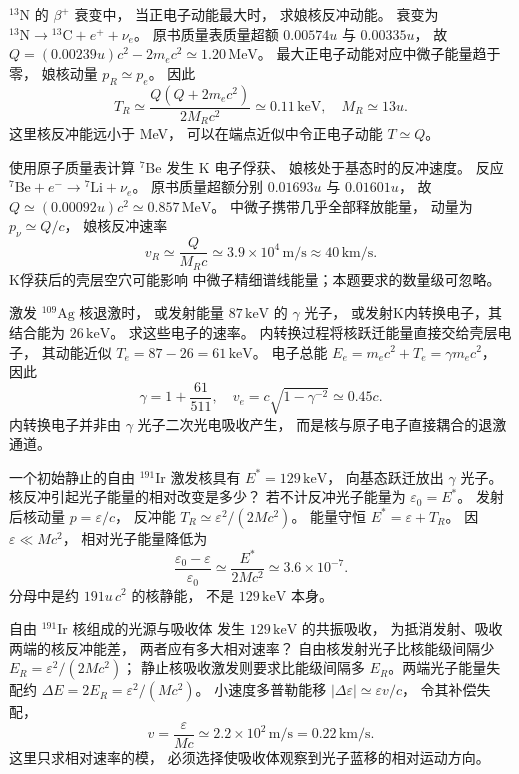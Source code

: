 $\mathrm{^{13}N}$ 的 $\beta^+$ 衰变中，
当正电子动能最大时，
求娘核反冲动能。
\exsolution
衰变为 $\mathrm{^{13}N}\to
\mathrm{^{13}C}+e^++\nu_e$。
原书质量表质量超额
$0.00574u$ 与 $0.00335u$，
故
$Q=(0.00239u)c^2-2m_ec^2
 \simeq1.20\,\mathrm{MeV}$。
最大正电子动能对应中微子能量趋于零，
娘核动量 $p_R\simeq p_e$。
因此
\[
 \boxed{T_R\simeq
 \frac{Q(Q+2m_ec^2)}{2M_Rc^2}
 \simeq0.11\,\mathrm{keV}},
 \quad M_R\simeq13u.
\]
\excheck 这里核反冲能远小于 MeV，
可以在端点近似中令正电子动能 $T\simeq Q$。

使用原子质量表计算
$\mathrm{^{7}Be}$ 发生 K 电子俘获、
娘核处于基态时的反冲速度。
\exsolution
反应
$\mathrm{^{7}Be}+e^-\to\mathrm{^{7}Li}+\nu_e$。
原书质量超额分别
$0.01693u$ 与 $0.01601u$，
故 $Q\simeq(0.00092u)c^2
 \simeq0.857\,\mathrm{MeV}$。
中微子携带几乎全部释放能量，
动量为 $p_\nu\simeq Q/c$，
娘核反冲速率
\[
 \boxed{v_R\simeq\frac{Q}{M_Rc}
 \simeq3.9\times10^4\,\mathrm{m/s}
 \approx40\,\mathrm{km/s}}.
\]
\excheck K俘获后的壳层空穴可能影响
中微子精细谱线能量；本题要求的数量级可忽略。

激发 $\mathrm{^{109}Ag}$ 核退激时，
或发射能量 $87\,\mathrm{keV}$ 的 $\gamma$ 光子，
或发射K内转换电子，其结合能为
$26\,\mathrm{keV}$。
求这些电子的速率。
\exsolution
内转换过程将核跃迁能量直接交给壳层电子，
其动能近似
$T_e=87-26=61\,\mathrm{keV}$。
电子总能
$E_e=m_ec^2+T_e=\gamma m_ec^2$，
因此
\[
 \gamma=1+\frac{61}{511},\quad
 \boxed{v_e=c\sqrt{1-\gamma^{-2}}
 \simeq0.45c}.
\]
\excheck 内转换电子并非由 $\gamma$ 光子二次光电吸收产生，
而是核与原子电子直接耦合的退激通道。

一个初始静止的自由
$\mathrm{^{191}Ir}$ 激发核具有
$E^*=129\,\mathrm{keV}$，
向基态跃迁放出 $\gamma$ 光子。
核反冲引起光子能量的相对改变是多少？
\exsolution
若不计反冲光子能量为 $\varepsilon_0=E^*$。
发射后核动量 $p=\varepsilon/c$，
反冲能
$T_R\simeq\varepsilon^2/(2Mc^2)$。
能量守恒
$E^*=\varepsilon+T_R$。
因 $\varepsilon\ll Mc^2$，
相对光子能量降低为
\[
 \boxed{\frac{\varepsilon_0-\varepsilon}{\varepsilon_0}
 \simeq\frac{E^*}{2Mc^2}
 \simeq3.6\times10^{-7}}.
\]
\excheck 分母中是约 $191u\,c^2$ 的核静能，
不是 $129\,\mathrm{keV}$ 本身。

自由 $\mathrm{^{191}Ir}$ 核组成的光源与吸收体
发生 $129\,\mathrm{keV}$ 的共振吸收，
为抵消发射、吸收两端的核反冲能差，
两者应有多大相对速率？
\exsolution
自由核发射光子比核能级间隔少
$E_R=\varepsilon^2/(2Mc^2)$；
静止核吸收激发则要求比能级间隔多
$E_R$。两端光子能量失配约
$\Delta E=2E_R=\varepsilon^2/(Mc^2)$。
小速度多普勒能移
$|\Delta\varepsilon|\simeq\varepsilon v/c$，
令其补偿失配，
\[
 \boxed{v=\frac{\varepsilon}{Mc}
 \simeq2.2\times10^2\,\mathrm{m/s}
 =0.22\,\mathrm{km/s}}.
\]
\excheck 这里只求相对速率的模，
必须选择使吸收体观察到光子蓝移的相对运动方向。

